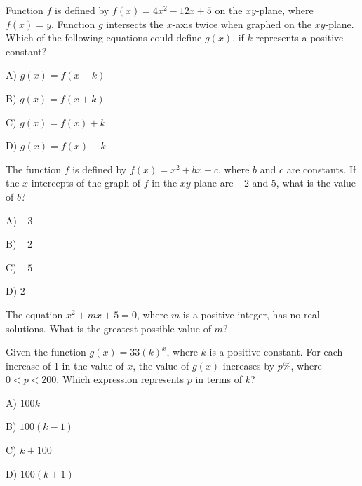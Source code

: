 \vfill
\noindent\begin{minipage}{\linewidth}
\par\smallskip
Function $f$ is defined by $f(x)=4x^2-12x+5$ on the $xy$-plane, where $f(x)=y$. Function $g$ intersects the $x$-axis twice when graphed on the $xy$-plane. Which of the following equations could define $g(x)$, if $k$ represents a positive constant?
\begin{satchoices}
  \item[A)] $g(x)=f(x-k)$
  \item[B)] $g(x)=f(x+k)$
  \item[C)] $g(x)=f(x)+k$
  \item[D)] $g(x)=f(x)-k$
\end{satchoices}
\end{minipage}
\vfill
\clearpage
\noindent\begin{minipage}{\linewidth}
\par\smallskip
The function $f$ is defined by $f(x)=x^2+bx+c$, where $b$ and $c$ are constants. If the $x$-intercepts of the graph of $f$ in the $xy$-plane are $-2$ and $5$, what is the value of $b$?
\begin{satchoices}
  \item[A)] $-3$
  \item[B)] $-2$
  \item[C)] $-5$
  \item[D)] $2$
\end{satchoices}
\end{minipage}
\vfill
\noindent\begin{minipage}{\linewidth}
\par\smallskip
The equation $x^2+mx+5=0$, where $m$ is a positive integer, has no real solutions. What is the greatest possible value of $m$?
\end{minipage}
\vfill
\noindent\begin{minipage}{\linewidth}
\par\smallskip
Given the function $g(x)=33(k)^x$, where $k$ is a positive constant. For each increase of 1 in the value of $x$, the value of $g(x)$ increases by $p\%$, where $0<p<200$. Which expression represents $p$ in terms of $k$?
\begin{satchoices}
  \item[A)] $100k$
  \item[B)] $100(k-1)$
  \item[C)] $k+100$
  \item[D)] $100(k+1)$
\end{satchoices}
\end{minipage}
